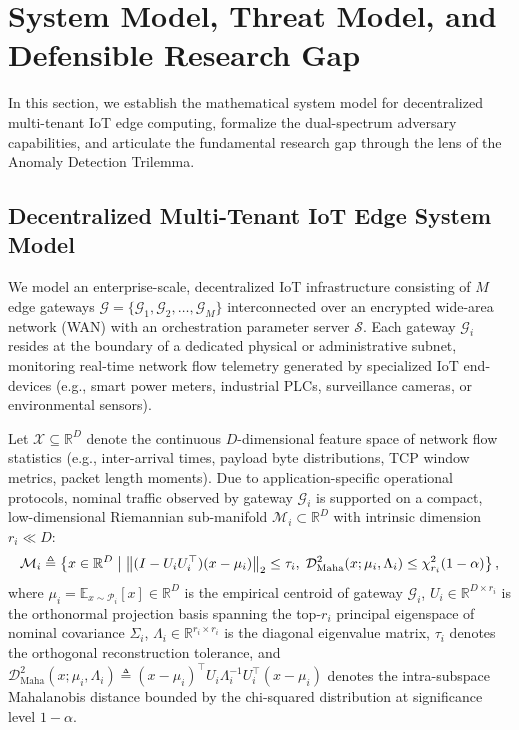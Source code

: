 
\section{System Model, Threat Model, and Defensible Research Gap}
\label{sec:threat_model}

In this section, we establish the mathematical system model for decentralized multi-tenant IoT edge computing, formalize the dual-spectrum adversary capabilities, and articulate the fundamental research gap through the lens of the Anomaly Detection Trilemma.

\subsection{Decentralized Multi-Tenant IoT Edge System Model}
\label{subsec:system_model}

We model an enterprise-scale, decentralized IoT infrastructure consisting of $M$ edge gateways $\mathcal{G} = \{\mathcal{G}_1, \mathcal{G}_2, \dots, \mathcal{G}_M\}$ interconnected over an encrypted wide-area network (WAN) with an orchestration parameter server $\mathcal{S}$. Each gateway $\mathcal{G}_i$ resides at the boundary of a dedicated physical or administrative subnet, monitoring real-time network flow telemetry generated by specialized IoT end-devices (e.g., smart power meters, industrial PLCs, surveillance cameras, or environmental sensors). 

Let $\mathcal{X} \subseteq \mathbb{R}^D$ denote the continuous $D$-dimensional feature space of network flow statistics (e.g., inter-arrival times, payload byte distributions, TCP window metrics, packet length moments). Due to application-specific operational protocols, nominal traffic observed by gateway $\mathcal{G}_i$ is supported on a compact, low-dimensional Riemannian sub-manifold $\mathcal{M}_i \subset \mathbb{R}^D$ with intrinsic dimension $r_i \ll D$:
\begin{equation}
\label{eq:nominal_manifold}
\mathcal{M}_i \triangleq \left\{ x \in \mathbb{R}^D \;\middle|\; \left\lVert(I - U_i U_i^\top)(x - \mu_i)\right\rVert_2 \le \tau_i, \; \mathcal{D}_{\text{Maha}}^2(x; \mu_i, \Lambda_i) \le \chi^2_{r_i}(1-\alpha) \right\},
\end{equation}
where $\mu_i = \mathbb{E}_{x \sim \mathcal{P}_i}[x] \in \mathbb{R}^D$ is the empirical centroid of gateway $\mathcal{G}_i$, $U_i \in \mathbb{R}^{D \times r_i}$ is the orthonormal projection basis spanning the top-$r_i$ principal eigenspace of nominal covariance $\Sigma_i$, $\Lambda_i \in \mathbb{R}^{r_i \times r_i}$ is the diagonal eigenvalue matrix, $\tau_i$ denotes the orthogonal reconstruction tolerance, and $\mathcal{D}_{\text{Maha}}^2(x; \mu_i, \Lambda_i) \triangleq (x - \mu_i)^\top U_i \Lambda_i^{-1} U_i^\top (x - \mu_i)$ denotes the intra-subspace Mahalanobis distance bounded by the chi-squared distribution at significance level $1-\alpha$.

